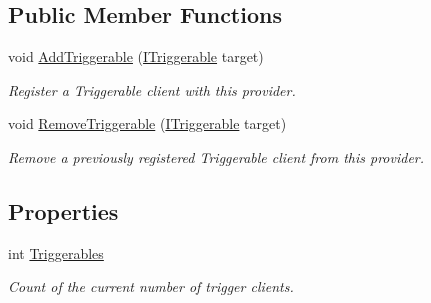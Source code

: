 \subsection*{Public Member Functions}
\begin{DoxyCompactItemize}
\item 
\hypertarget{interfacestrange_1_1extensions_1_1dispatcher_1_1api_1_1_i_trigger_provider_aaf6162c2f0f00d6b42076f7b2397828a}{void \hyperlink{interfacestrange_1_1extensions_1_1dispatcher_1_1api_1_1_i_trigger_provider_aaf6162c2f0f00d6b42076f7b2397828a}{Add\-Triggerable} (\hyperlink{interfacestrange_1_1extensions_1_1dispatcher_1_1api_1_1_i_triggerable}{I\-Triggerable} target)}\label{interfacestrange_1_1extensions_1_1dispatcher_1_1api_1_1_i_trigger_provider_aaf6162c2f0f00d6b42076f7b2397828a}

\begin{DoxyCompactList}\small\item\em Register a Triggerable client with this provider. \end{DoxyCompactList}\item 
\hypertarget{interfacestrange_1_1extensions_1_1dispatcher_1_1api_1_1_i_trigger_provider_ad582237786b479b01b15b42e4751a0de}{void \hyperlink{interfacestrange_1_1extensions_1_1dispatcher_1_1api_1_1_i_trigger_provider_ad582237786b479b01b15b42e4751a0de}{Remove\-Triggerable} (\hyperlink{interfacestrange_1_1extensions_1_1dispatcher_1_1api_1_1_i_triggerable}{I\-Triggerable} target)}\label{interfacestrange_1_1extensions_1_1dispatcher_1_1api_1_1_i_trigger_provider_ad582237786b479b01b15b42e4751a0de}

\begin{DoxyCompactList}\small\item\em Remove a previously registered Triggerable client from this provider. \end{DoxyCompactList}\end{DoxyCompactItemize}
\subsection*{Properties}
\begin{DoxyCompactItemize}
\item 
\hypertarget{interfacestrange_1_1extensions_1_1dispatcher_1_1api_1_1_i_trigger_provider_a20f6fb926e6784829061c7204ea0dad7}{int \hyperlink{interfacestrange_1_1extensions_1_1dispatcher_1_1api_1_1_i_trigger_provider_a20f6fb926e6784829061c7204ea0dad7}{Triggerables}}\label{interfacestrange_1_1extensions_1_1dispatcher_1_1api_1_1_i_trigger_provider_a20f6fb926e6784829061c7204ea0dad7}

\begin{DoxyCompactList}\small\item\em Count of the current number of trigger clients. \end{DoxyCompactList}\end{DoxyCompactItemize}


